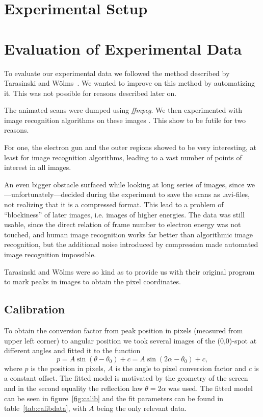 \documentclass[a4paper,10pt]{scrartcl}
\begin{document}
\section{Experimental Setup}

\section{Evaluation of Experimental Data}

To evaluate our experimental data we followed the method described by Tarasinski and Wölms~\cite{brian}. We wanted to improve on this method by automatizing it. This was not possible for reasons described later on.

The animated scans were dumped using \textit{ffmpeg}. We then experimented with image recognition algorithms on these images . This show to be futile for two reasons. 

For one, the electron gun and the outer regions showed to be very interesting, at least for image recognition algorithms, leading to a vast number of points of interest in all images. 

An even bigger obstacle surfaced while looking at long series of images, since we---unfortunately---decided during the experiment to save the scans as .avi-files, not realizing that it is a compressed format. This lead to a problem of ``blockiness'' of later images, i.e. images of higher energies. The data was still usable, since the direct relation of frame number to electron energy was not touched, and human image recognition works far better than algorithmic image recognition, but the additional noise introduced by compression made automated image recognition impossible.

Tarasinski and Wölms were so kind as to provide us with their original program to mark peaks in images to obtain the pixel coordinates.

\subsection{Calibration}

To obtain the conversion factor from peak position in pixels (measured from upper left corner) to angular position we took several images of the (0,0)-spot at different angles and fitted it to the function
\begin{equation}
p = A \sin( \theta - \theta_{0} ) + c = A \sin( 2\alpha - \theta_{0} ) + c, \label{eq:calibmodel}
\end{equation}
where $p$ is the position in pixels, $A$ is the angle to pixel conversion factor and $c$ is a constant offset. The fitted model is motivated by the geometry of the screen and in the second equality the reflection law $\theta=2\alpha$ was used. The fitted model can be seen in figure~\ref{fig:calib} and the fit parameters can be found in table~\ref{tab:calibdata}, with $A$ being the only relevant data.
\end{document}
